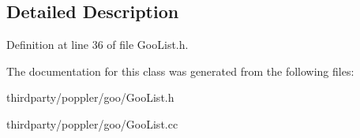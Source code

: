 \subsection{Detailed Description}


Definition at line 36 of file Goo\+List.\+h.



The documentation for this class was generated from the following files\+:\begin{DoxyCompactItemize}
\item 
thirdparty/poppler/goo/Goo\+List.\+h\item 
thirdparty/poppler/goo/Goo\+List.\+cc\end{DoxyCompactItemize}
